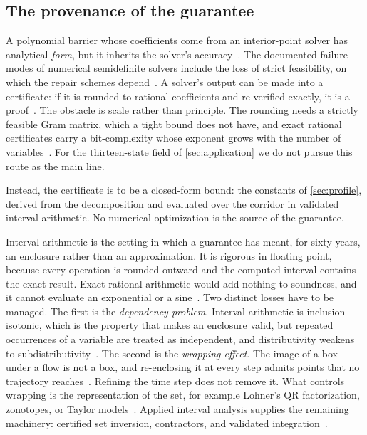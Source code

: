 \documentclass[english,11pt]{extarticle}
\begin{document}
\subsection{The provenance of the guarantee}\label{sec:provenance}
A polynomial barrier whose coefficients come from an interior-point solver
has analytical \emph{form}, but it inherits the solver's
accuracy~\cite{prajna2007framework}. The documented failure modes of
numerical semidefinite solvers include the loss of strict feasibility, on
which the repair schemes depend~\cite{roux2018validating}. A solver's output
can be made into a certificate: if it is rounded to rational coefficients
and re-verified exactly, it is a proof~\cite{peyrl2008computing}. The
obstacle is scale rather than principle. The rounding needs a strictly
feasible Gram matrix, which a tight bound does not have, and exact rational
certificates carry a bit-complexity whose exponent grows with the number of
variables~\cite{kaltofen2012exact,magron2021exact}. For the thirteen-state
field of \cref{sec:application} we do not pursue this route as the main
line.

Instead, the certificate is to be a closed-form bound: the constants of
\cref{sec:profile}, derived from the decomposition and evaluated over the
corridor in validated interval arithmetic. No numerical optimization is the
source of the guarantee.

Interval arithmetic is the setting in which a guarantee has meant, for sixty
years, an enclosure rather than an approximation. It is rigorous in floating
point, because every operation is rounded outward and the computed interval
contains the exact result. Exact rational arithmetic would add nothing to
soundness, and it cannot evaluate an exponential or a
sine~\cite[Ch.~3]{moore2009introduction}. Two distinct losses have to be
managed. The first is the \emph{dependency problem}. Interval arithmetic is
inclusion isotonic, which is the property that makes an enclosure valid, but
repeated occurrences of a variable are treated as independent, and
distributivity weakens to
subdistributivity~\cite[Chs.~4--5]{moore2009introduction}. The second is the
\emph{wrapping effect}. The image of a box under a flow is not a box, and
re-enclosing it at every step admits points that no trajectory
reaches~\cite[Ch.~10]{moore2009introduction}. Refining the time step does
not remove it. What controls wrapping is the representation of the set, for
example Lohner's QR factorization, zonotopes, or Taylor
models~\cite{nedialkov1999validated,makino2003taylor}. Applied interval
analysis supplies the remaining machinery: certified set inversion,
contractors, and validated integration~\cite{jaulin2001applied}.
\end{document}
